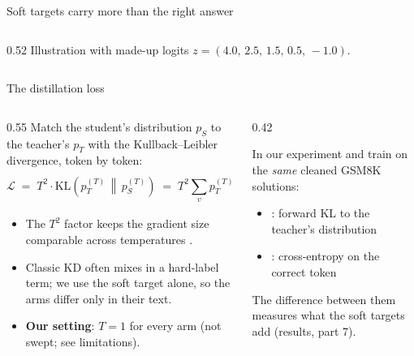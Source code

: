 \begin{frame}{Soft targets carry more than the right answer\hfill\est\ }
\begin{columns}[c]
\begin{column}{0.52\textwidth}
      {\tiny\color{kdgray} Illustration with made-up logits $z=(4.0,\,2.5,\,1.5,\,0.5,\,-1.0)$.}
    \end{column}
  \end{columns}
\end{frame}

\begin{frame}{The distillation loss\hfill\est\ }
  \begin{columns}[T]
    \begin{column}{0.55\textwidth}
      \small
      Match the student's distribution $p_S$ to the teacher's $p_T$ with
      the Kullback--Leibler divergence, token by token:
      \[
        \mathcal{L} \;=\; T^2 \cdot \mathrm{KL}\!\left(p_T^{(T)} \,\middle\|\, p_S^{(T)}\right)
        \;=\; T^2 \sum_{v} p_T^{(T)}(v)\,\log\frac{p_T^{(T)}(v)}{p_S^{(T)}(v)}
      \]
      \begin{itemize}
        \item<2-> The $T^2$ factor keeps the gradient size comparable
              across temperatures .
        \item<3-> Classic KD often mixes in a hard-label term; we use the
              soft target alone, so the arms differ only in their text.
        \item<4-> \textbf{Our setting}: $T = 1$ for every arm (not swept;
              see limitations).
      \end{itemize}
    \end{column}
    \begin{column}{0.42\textwidth}
      \begin{block}{In our experiment}
        \footnotesize
         and  train on the \emph{same}
        cleaned GSM8K solutions:
        \begin{itemize}
          \item {}: forward KL to the teacher's distribution
          \item {}: cross-entropy on the correct token
        \end{itemize}
        The difference between them measures what the soft targets add
        (results, part 7).
      \end{block}
    \end{column}
  \end{columns}
\end{frame}

